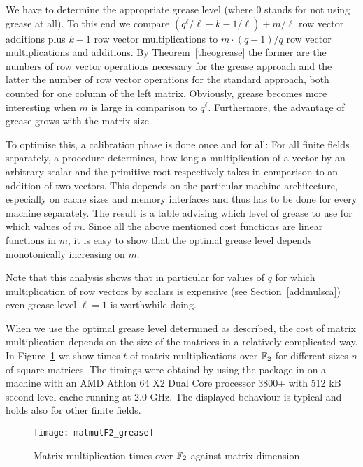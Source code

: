 We have to determine the appropriate grease level (where $0$ stands for not
using grease at all). To this end we 
compare $(q^\ell/\ell - k - 1/\ell) + m/\ell$ 
row vector additions plus $k-1$ row vector multiplications to
$m \cdot (q-1)/q$ row vector multiplications and additions.
By Theorem~\ref{theogrease} the former are the numbers of row vector
operations necessary for the grease approach and the latter the number
of row vector operations for the standard approach, both counted for
one column of the left matrix. Obviously, grease becomes more interesting 
when $m$ is large in comparison to $q^\ell$. 
Furthermore, the advantage of grease
grows with the matrix size.

To optimise this, a calibration phase is done once and for all: For all finite
fields separately, a procedure determines, how long a multiplication
of a vector by an arbitrary scalar and the primitive root respectively
takes in comparison to an addition of two vectors.
This depends on the particular machine architecture, especially on 
cache sizes and memory interfaces and thus has to be done for every
machine separately. The result is a table advising which level of grease
to use for which values of $m$. Since all the above mentioned cost
functions are linear functions in $m$, it is easy to show that the
optimal grease level depends monotonically increasing on $m$.

Note that this analysis shows that in particular for values of $q$
for which multiplication of row vectors by scalars is expensive (see
Section~\ref{addmulsca}) even grease level $\ell = 1$ is worthwhile
doing.

When we use the optimal grease level determined as described, the
cost of matrix multiplication depends on the size of the matrices
in a relatively complicated way. In Figure~\ref{matmulgrease} we
show times $t$ of matrix multiplications over $\mathbb{F}_2$ for different
sizes $n$ of square matrices. The timings were obtaind by using the
{\cvec} package in {\GAP} on a machine with an AMD Athlon 64 X2 Dual
Core processor 3800+ with 512 kB second level cache running at
2.0 GHz. The displayed behaviour is typical and
holds also for other finite fields.

\begin{figure}[ht]
\begin{center}
\texttt{[image: matmulF2\_grease]}
\end{center}
\caption{Matrix multiplication times over $\mathbb{F}_2$ against matrix dimension}
\label{matmulgrease}
\end{figure}

